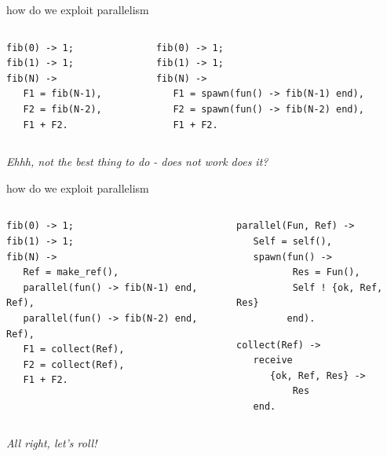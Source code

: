 \begin{frame}[fragile]{how do we exploit parallelism}

\begin{columns}
 \begin{column}{0.5\linewidth}
\begin{verbatim}
fib(0) -> 1;
fib(1) -> 1;
fib(N) ->  
   F1 = fib(N-1),
   F2 = fib(N-2),
   F1 + F2.
\end{verbatim}
 \end{column}
\pause
 \begin{column}{0.5\linewidth}
\begin{verbatim}
fib(0) -> 1;
fib(1) -> 1;
fib(N) ->  
   F1 = spawn(fun() -> fib(N-1) end),
   F2 = spawn(fun() -> fib(N-2) end),
   F1 + F2.
\end{verbatim}
 \end{column}
\end{columns}

\pause\vspace{20pt}
{\em Ehhh, not the best thing to do - does not work does it?}

\end{frame}


\begin{frame}[fragile]{how do we exploit parallelism}

\begin{columns}
 \begin{column}{0.6\linewidth}
 \begin{verbatim}
fib(0) -> 1;
fib(1) -> 1;
fib(N) -> 
   Ref = make_ref(),
   parallel(fun() -> fib(N-1) end, Ref),
   parallel(fun() -> fib(N-2) end, Ref),
   F1 = collect(Ref),
   F2 = collect(Ref),
   F1 + F2.
\end{verbatim}
 \end{column}
\pause
 \begin{column}{0.4\linewidth}
\begin{verbatim}
parallel(Fun, Ref) ->
   Self = self(),
   spawn(fun() -> 
          Res = Fun(), 
          Self ! {ok, Ref, Res}
         end).
\end{verbatim}
\begin{verbatim}
collect(Ref) ->
   receive 
      {ok, Ref, Res} ->
          Res
   end.
\end{verbatim}
 \end{column}
\end{columns}

\pause\vspace{20pt}
{\em All right, let's roll!}

\end{frame}

